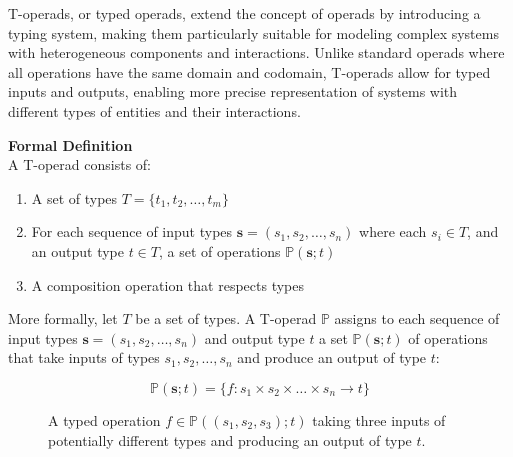 T-operads, or typed operads, extend the concept of operads by introducing a typing system, making them particularly suitable for modeling complex systems with heterogeneous components and interactions. Unlike standard operads where all operations have the same domain and codomain, T-operads allow for typed inputs and outputs, enabling more precise representation of systems with different types of entities and their interactions.

\textbf{Formal Definition}
\\

A T-operad consists of:

\begin{enumerate}
  \item A set of types $T = \{t_1, t_2, \ldots, t_m\}$
  \item For each sequence of input types $\mathbf{s} = (s_1, s_2, \ldots, s_n)$ where each $s_i \in T$, and an output type $t \in T$, a set of operations $\mathbb{P}(\mathbf{s}; t)$
  \item A composition operation that respects types
\end{enumerate}

More formally, let $T$ be a set of types. A T-operad $\mathbb{P}$ assigns to each sequence of input types $\mathbf{s} = (s_1, s_2, \ldots, s_n)$ and output type $t$ a set $\mathbb{P}(\mathbf{s}; t)$ of operations that take inputs of types $s_1, s_2, \ldots, s_n$ and produce an output of type $t$:

\begin{equation}
  \mathbb{P}(\mathbf{s}; t) = \{f: s_1 \times s_2 \times \ldots \times s_n \rightarrow t\}
\end{equation}

\begin{figure}[h]
\centering
{}
\caption{A typed operation $f \in \mathbb{P}((s_1, s_2, s_3); t)$ taking three inputs of potentially different types and producing an output of type $t$.}
\label{fig:typed-operation}
\end{figure}

